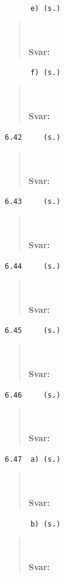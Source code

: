 \documentclass[a4paper]{article}
\newcommand{\tskcol}[1]{\textcolor{tskcol}{#1}}
\begin{document}
	\texttt{\tskcol{~~~~~~e) (s.)}}
	\begin{quotation}
		\noindent
		\\ \\
		\textbf{Svar:}
	\end{quotation}
	
	\texttt{\tskcol{~~~~~~f) (s.)}}
	\begin{quotation}
		\noindent
		\\ \\
		\textbf{Svar:}
	\end{quotation}
	
	\texttt{\tskcol{6.42~~~~ (s.)}}
	\begin{quotation}
		\noindent
		\\ \\
		\textbf{Svar:}
	\end{quotation}
	
	\texttt{\tskcol{6.43~~~~ (s.)}}
	\begin{quotation}
		\noindent
		\\ \\
		\textbf{Svar:}
	\end{quotation}
	
	\texttt{\tskcol{6.44~~~~ (s.)}}
	\begin{quotation}
		\noindent
		\\ \\
		\textbf{Svar:}
	\end{quotation}
	
	\texttt{\tskcol{6.45~~~~ (s.)}}
	\begin{quotation}
		\noindent
		\\ \\
		\textbf{Svar:}
	\end{quotation}
	
	\texttt{\tskcol{6.46~~~~ (s.)}}
	\begin{quotation}
		\noindent
		\\ \\
		\textbf{Svar:}
	\end{quotation}
	
	\texttt{\tskcol{6.47~~a) (s.)}}
	\begin{quotation}
		\noindent
		\\ \\
		\textbf{Svar:}
	\end{quotation}
	
	\texttt{\tskcol{~~~~~~b) (s.)}}
	\begin{quotation}
		\noindent
		\\ \\
		\textbf{Svar:}
	\end{quotation}
	
\end{document}
